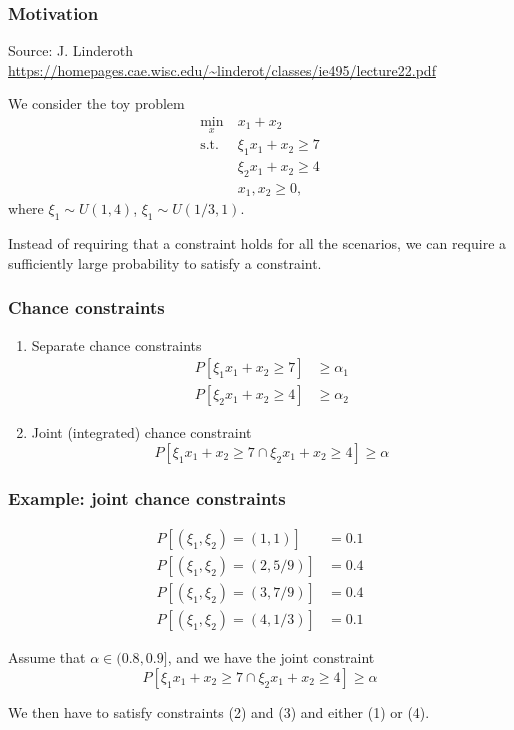 \documentclass{beamer}
\begin{document}
\begin{frame}
\frametitle{Motivation}

Source: J. Linderoth \url{https://homepages.cae.wisc.edu/~linderot/classes/ie495/lecture22.pdf}

We consider the toy problem
\begin{align*}
\min_x\ & x_1 + x_2 \\
\mbox{s.t. } & \xi_1 x_1 + x_2 \geq 7 \\
& \xi_2 x_1 + x_2 \geq 4 \\
& x_1, x_2 \geq 0,
\end{align*}
where $\xi_1 \sim U(1,4)$, $\xi_1 \sim U(1/3,1)$.

\mbox{} 

Instead of requiring that a constraint holds for all the scenarios, we can require a sufficiently large probability to satisfy a constraint.

\end{frame}

\begin{frame}
\frametitle{Chance constraints}

\begin{enumerate}
\item 
Separate chance constraints
\begin{align*}
P [ \xi_1x_1 + x_2 \geq 7 ] &\geq \alpha_1 \\
P [ \xi_2x_1 + x_2 \geq 4 ] &\geq \alpha_2
\end{align*}
\item
Joint (integrated) chance constraint
\[
P [ \xi_1x_1 + x_2 \geq 7 \cap \xi_2x_1 + x_2 \geq 4 ] \geq \alpha
\]
\end{enumerate}

\end{frame}

\begin{frame}
\frametitle{Example: joint chance constraints}

\begin{align}
P[(\xi_1, \xi_2) = (1,1)] &= 0.1 \\
P[(\xi_1, \xi_2) = (2,5/9)] &= 0.4 \\
P[(\xi_1, \xi_2) = (3,7/9)] &= 0.4 \\
P[(\xi_1, \xi_2) = (4,1/3)] &= 0.1
\end{align}

\mbox{}

Assume that $\alpha \in (0.8,0.9]$, and we have the joint constraint
\[
P [ \xi_1x_1 + x_2 \geq 7 \cap \xi_2x_1 + x_2 \geq 4 ] \geq \alpha
\]

\mbox{}

We then have to satisfy constraints (2) and (3) and either (1) or (4).

\end{frame}
\end{document}
